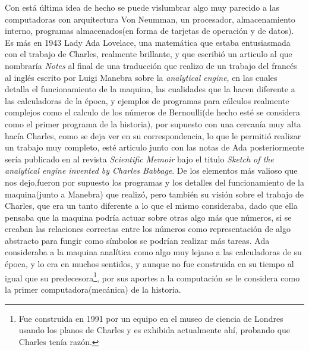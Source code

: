 \documentclass[letterpaper,12pt,oneside]{book}
\begin{document}
		Con está última idea de hecho se puede vislumbrar algo muy parecido a las computadoras con arquitectura Von Neumman, un procesador, almacenamiento interno,
		programas almacenados(en forma de tarjetas de operación y de datos)\cite[p.204]{oregan_brief_2012}. Es más en 1943 Lady Ada Lovelace, una matemática
		que estaba entusiasmada con el trabajo de Charles, realmente brillante, y que escribió un articulo al que 
		nombraría \textit{Notes} al final de una traducción que realizo de un trabajo
		del francés al inglés escrito por Luigi Manebra sobre la \textit{analytical engine}, en las cuales detalla el funcionamiento de la maquina, las cualidades que la 
		hacen diferente a las calculadoras de la época, y
		ejemplos de programas para cálculos realmente complejos como el calculo de los números de Bernoulli(de hecho esté se considera como
		el primer programa de la historia), por supuesto con una cercanía muy alta hacía Charles, como se deja ver en su correspondencia, lo que le permitió realizar un 	
		trabajo muy completo, esté articulo junto con las notas de Ada posteriormente sería publicado
		en al revista \textit{Scientific Memoir} bajo el titulo \textit{Sketch of the analytical engine invented by Charles Babbage}. De los elementos más valioso que nos 
		dejo,fueron por supuesto los programas y los detalles del funcionamiento de la maquina(junto a Manebra) que realizó, pero también su visión sobre el trabajo de 
		Charles, que era un tanto diferente a lo que el mismo consideraba, dado que 
		ella pensaba que la maquina podría actuar sobre otras algo más que números, si se creaban las relaciones correctas entre los números  como representación de algo 
		abstracto para fungir como símbolos se podrían realizar más tareas. Ada consideraba a la maquina analítica como algo muy lejano a las calculadoras de su época,
		y lo era en muchos sentidos, y aunque no fue construida en su tiempo al igual que su predecesora\footnote{Fue construida en 1991 por un equipo en el museo de ciencia de Londres usando los planos de Charles y es exhibida actualmente ahí, probando que Charles tenía razón.}, por sus aportes a la computación
		se le considera como la primer computadora(mecánica) de la historia\cite{eric_kim_ada_1999}.
		
\end{document}
